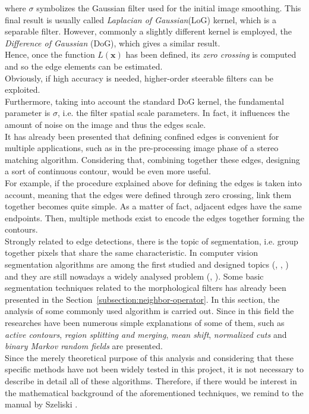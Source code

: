 where $\sigma$ symbolizes the Gaussian filter used for the initial image smoothing.
This final result is usually called \textit{Laplacian of Gaussian}(LoG) kernel, which is a separable filter.
However, commonly a slightly different kernel is employed, the \textit{Difference of Gaussian} (DoG), which gives a similar result.\\
Hence, once the function $L(\mathbf{x})$ has been defined, its \textit{zero crossing} is computed and so the edge elements can be estimated. \\
Obviously, if high accuracy is needed, higher-order steerable filters can be exploited.\\
Furthermore, taking into account the standard DoG kernel, the fundamental parameter is $\sigma$, i.e. the filter spatial scale parameters.
In fact, it influences the amount of noise on the image and thus the edges scale. \\
It has already been presented that defining confined edges is convenient for multiple applications, such as in the pre-processing image phase of a stereo matching algorithm.
Considering that, combining together these edges, designing a sort of continuous contour, would be even more useful.\\
For example, if the procedure explained above for defining the edges is taken into account, meaning that the edges were defined through zero crossing, link them together becomes quite simple. 
As a matter of fact, adjacent edges have the same endpoints. 
Then, multiple methods exist to encode the edges together forming the contours.\\
Strongly related to edge detections, there is the topic of segmentation, i.e. group together pixels that share the same characteristic.
In computer vision segmentation algorithms are among the first studied and designed topics (\cite{ohlander1978picture}, \cite{Brice1970}, \cite{haralick1985image}) and they are still nowadays a widely analysed problem (\cite{comaniciu2002mean}, \cite{cremers2007review}). 
Some basic segmentation techniques related to the morphological filters has already been presented in the Section~\ref{subsection:neighbor-operator}. 
In this section, the analysis of some commonly used algorithm is carried out.
Since in this field the researches have been numerous simple explanations of some of them, such as \textit{active contours}, \textit{region splitting and merging}, \textit{mean shift}, \textit{normalized cuts} and \textit{binary Markov random fields} are presented. \\
Since the merely theoretical purpose of this analysis and considering that these specific methods have not been widely tested in this project, it is not necessary to describe in detail all of these algorithms.
Therefore, if there would be interest in the mathematical background of the aforementioned techniques, we remind to the manual by Szeliski \cite{Szeliski2011}.

